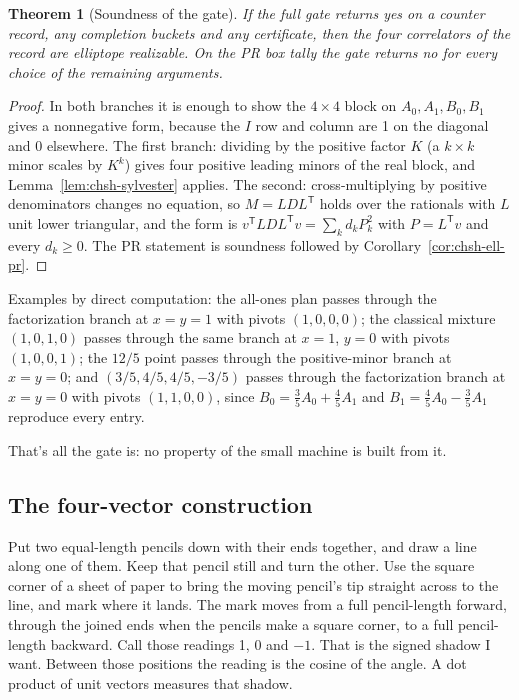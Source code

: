\documentclass[11pt,twoside]{article}
\theoremstyle{thielethm}
\newtheorem{theorem}{Theorem}[section]
\theoremstyle{thieledef}
\theoremstyle{thieledef}
\theoremstyle{thieledef}
\theoremstyle{thielethm}
\theoremstyle{thieleobs}
\theoremstyle{thielethm}
\begin{document}
\begin{theorem}[Soundness of the gate]
If the full gate returns yes on a counter record, any
completion buckets and any certificate, then the four correlators of the record are
elliptope realizable. On the PR box
tally the gate returns no for every choice of the remaining arguments.
\end{theorem}

\begin{proof}
In both branches it is enough to show the $4 \times 4$ block on $A_0, A_1, B_0, B_1$ gives a
nonnegative form, because the $I$ row and column are 1 on the diagonal and 0 elsewhere. The
first branch: dividing by the positive factor $K$ (a $k \times k$ minor scales by $K^k$) gives four
positive leading minors of the real block, and Lemma~\ref{lem:chsh-sylvester} applies. The
second: cross-multiplying by positive denominators changes no equation, so $M = LDL^{\mathsf T}$
holds over the rationals with $L$ unit lower triangular, and the form is
$v^{\mathsf T} L D L^{\mathsf T} v = \sum_k d_k P_k^2$ with $P = L^{\mathsf T} v$ and every
$d_k \ge 0$. The PR statement is soundness followed by Corollary~\ref{cor:chsh-ell-pr}.
\end{proof}

Examples by direct computation: the all-ones plan passes through the factorization branch
at $x=y=1$ with pivots $(1,0,0,0)$; the classical mixture $(1,0,1,0)$ passes through the same
branch at $x=1$, $y=0$ with pivots $(1,0,0,1)$; the $12/5$ point passes through the
positive-minor branch at $x=y=0$; and $(3/5,4/5,4/5,-3/5)$ passes through the factorization
branch at $x=y=0$ with pivots $(1,1,0,0)$, since $B_0 = \tfrac35 A_0 + \tfrac45 A_1$ and
$B_1 = \tfrac45 A_0 - \tfrac35 A_1$ reproduce every entry.

That's all the gate is: no property of the small machine is built from it.

\subsection{The four-vector construction}


Put two equal-length pencils down with their ends together, and draw a line along
one of them. Keep that pencil still and turn the other. Use the square corner of
a sheet of paper to bring the moving pencil's tip straight across to the line,
and mark where it lands. The mark moves from a full pencil-length forward,
through the joined ends when the pencils make a square corner, to a full
pencil-length backward. Call those readings 1, 0 and $-1$. That is the signed
shadow I want. Between those positions the reading is the cosine of the angle.
A dot product of unit vectors measures that shadow.
\end{document}
